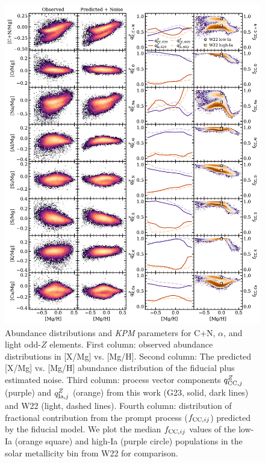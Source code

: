 \documentclass[modern]{aastex631}
\newcommand{\qcc}{q_{{\rm CC,}j}^{Z}}
\newcommand{\qIa}{q_{{\rm Ia,}j}^{Z}}
\newcommand{\fcc}{f_{{\rm CC}, ij}}
\newcommand{\name}{\textsl{KPM}}
\begin{document}
\begin{figure}[htb!]
    \centering
    \includegraphics[width=\textwidth]{Paper/Figures/all_param1.pdf}
    \caption{Abundance distributions and \name{} parameters for C+N, $\alpha$, and light odd-$Z$ elements. First column: observed abundance distributions in [X/Mg] vs. [Mg/H]. Second column: The predicted [X/Mg] vs. [Mg/H] abundance distribution of the fiducial plus estimated noise. Third column: process vector components $\qcc$ (purple) and $\qIa$ (orange) from this work (G23, solid, dark lines) and W22 (light, dashed lines). Fourth column: distribution of fractional contribution from the prompt process ($\fcc$) predicted by the fiducial model. We plot the median $\fcc$ values of the low-Ia (orange square) and high-Ia (purple circle) populations in the solar metallicity bin from W22 for comparison.}
    \label{fig:all_param1}
\end{figure}
\end{document}
